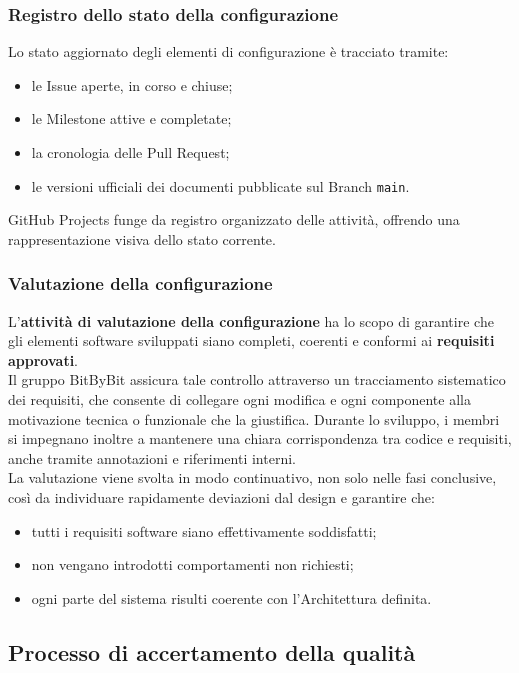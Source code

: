 \documentclass[a4paper,12pt]{article}
\begin{document}
\subsubsection{Registro dello stato della configurazione}
Lo stato aggiornato degli elementi di configurazione è tracciato tramite:
\begin{itemize}
    \item le Issue aperte, in corso e chiuse;
    \item le Milestone attive e completate;
    \item la cronologia delle Pull Request;
    \item le versioni ufficiali dei documenti pubblicate sul Branch \texttt{main}.
\end{itemize}
GitHub Projects funge da registro organizzato delle attività, offrendo una rappresentazione visiva dello stato corrente.

\subsubsection{Valutazione della configurazione}
L'\textbf{attività di valutazione della configurazione} ha lo scopo di garantire che gli elementi software sviluppati siano completi, coerenti e conformi ai \textbf{requisiti approvati}.\\Il gruppo BitByBit assicura tale controllo attraverso un tracciamento sistematico dei requisiti, che consente di collegare ogni modifica e ogni componente alla motivazione tecnica o funzionale che la giustifica. Durante lo sviluppo, i membri si impegnano inoltre a mantenere una chiara corrispondenza tra codice e requisiti, anche tramite annotazioni e riferimenti interni.\\La valutazione viene svolta in modo continuativo, non solo nelle fasi conclusive, così da individuare rapidamente deviazioni dal design e garantire che:
\begin{itemize}
    \item tutti i requisiti software siano effettivamente soddisfatti;
    \item non vengano introdotti comportamenti non richiesti;
    \item ogni parte del sistema risulti coerente con l’Architettura definita.
\end{itemize}

\subsection{Processo di accertamento della qualità} \label{sec:accertamento-qualita}
\end{document}
